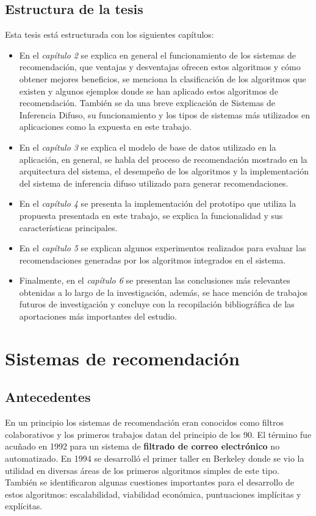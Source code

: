 \documentclass[12pt,letterpaper,oneside] {memoir}
\begin{document}
\section{Estructura de la tesis}

Esta tesis está estructurada con los siguientes capítulos:
\begin{itemize}
\item En el \textit{capítulo 2} se explica en general el funcionamiento de los sistemas de recomendación, que ventajas y desventajas ofrecen estos algoritmos y cómo obtener mejores beneficios, se menciona la clasificación de los algoritmos que existen y algunos ejemplos donde se han aplicado estos algoritmos de recomendación. También se da una breve explicación de Sistemas de Inferencia Difuso, su funcionamiento y los tipos de sistemas más utilizados en aplicaciones como la expuesta en este trabajo.
\item En el \textit{capítulo 3} se explica el modelo de base de datos utilizado en la aplicación, en general, se habla del proceso de recomendación mostrado en la arquitectura del sistema, el desempeño de los algoritmos y la implementación del sistema de inferencia difuso utilizado para generar recomendaciones.
\item En el \textit{capítulo 4} se presenta la implementación del prototipo que utiliza la propuesta presentada en este trabajo, se explica la funcionalidad y sus características principales.
\item En el \textit{capítulo 5} se explican algunos experimentos realizados para evaluar las recomendaciones generadas por los algoritmos integrados en el sistema.
\item Finalmente, en el \textit{capítulo 6} se presentan las conclusiones más relevantes obtenidas a lo largo de la investigación, además, se hace mención de trabajos futuros de investigación y concluye con la recopilación bibliográfica de las aportaciones más importantes del estudio.
\end{itemize}

\chapter{Sistemas de recomendación}
\section{Antecedentes}
En un principio los sistemas de recomendación eran conocidos como filtros colaborativos y los primeros trabajos datan del principio de los 90. El término fue acuñado en 1992  para un sistema de \textbf{filtrado de correo electrónico} no automatizado. En 1994 se desarrolló  el primer taller en Berkeley donde se vio la utilidad en diversas áreas de los primeros algoritmos simples de este tipo. También se identificaron algunas cuestiones importantes para el desarrollo de estos algoritmos: escalabilidad, viabilidad económica, puntuaciones implícitas y explícitas. 
\end{document}
